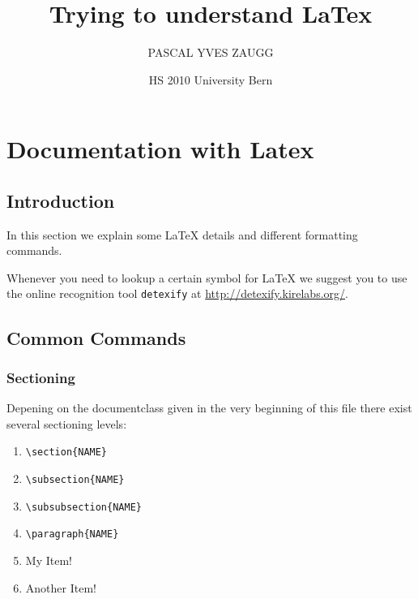 \documentclass[10pt,a4paper]{scrartcl}
\date{HS 2010 University Bern}
\author{PASCAL YVES ZAUGG}
\title{Trying to understand LaTex}
\begin{document}
\maketitle

\tableofcontents

\newpage
\section{Documentation with Latex}
\subsection{Introduction} 

In this section we explain some \LaTeX\xspace details and different formatting
commands.

Whenever you need to lookup a certain symbol for \LaTeX\xspace we suggest you
to use the online recognition tool \texttt{detexify} at
\url{http://detexify.kirelabs.org/}.


\subsection{Common Commands}
\subsubsection{Sectioning}
Depening on the documentclass given in the very beginning of this file there
exist several sectioning levels:
\begin{enumerate}
\item{} \verb$\section{NAME}$
\item{} \verb$\subsection{NAME}$
\item{} \verb$\subsubsection{NAME}$
\item{} \verb$\paragraph{NAME}$
\item{} My Item!
\item{} Another Item!
\end{enumerate}
\end{document}
